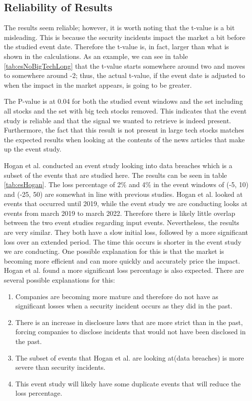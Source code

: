 \subsection{Reliability of Results}

The results seem reliable; however, it is worth noting that the t-value is a bit misleading. This is because the security incidents impact the market a bit before the studied event date. Therefore the t-value is, in fact, larger than what is shown in the calculations. As an example, we can see in table \ref{tab:esNoBigTechLong} that the t-value starts somewhere around two and moves to somewhere around -2; thus, the actual t-value, if the event date is adjusted to when the impact in the market appears, is going to be greater.

The P-value is at 0.04 for both the studied event windows and the set including all stocks and the set with big tech stocks removed. This indicates that the event study is reliable and that the signal we wanted to retrieve is indeed present. Furthermore, the fact that this result is not present in large tech stocks matches the expected results when looking at the contents of the news articles that make up the event study.

Hogan et al. \cite{hogan2020comprehensive} conducted an event study looking into data breaches which is a subset of the events that are studied here. The results can be seen in table \ref{tab:esHogan}. The loss percentage of 2\% and 4\% in the event windows of (-5, 10) and (-25, 50) are somewhat in line with previous studies. Hogan et al. looked at events that occurred until 2019, while the event study we are conducting looks at events from march 2019 to march 2022. Therefore there is likely little overlap between the two event studies regarding input events.
Nevertheless, the results are very similar. They both have a slow initial loss, followed by a more significant loss over an extended period. The time this occurs is shorter in the event study we are conducting. One possible explanation for this is that the market is becoming more efficient and can more quickly and accurately price the impact. Hogan et al. found a more significant loss percentage is also expected. There are several possible explanations for this:
\begin{enumerate}
    \item Companies are becoming more mature and therefore do not have as significant losses when a security incident occurs as they did in the past.
    \item There is an increase in disclosure laws that are more strict than in the past, forcing companies to disclose incidents that would not have been disclosed in the past.
    \item The subset of events that Hogan et al. are looking at(data breaches) is more severe than security incidents.
    \item This event study will likely have some duplicate events that will reduce the loss percentage.
\end{enumerate}


